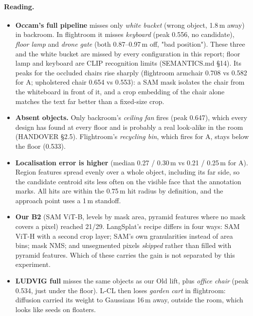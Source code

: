 \documentclass[11pt,a4paper]{article}
\begin{document}
\paragraph{Reading.}
\begin{itemize}[leftmargin=*,itemsep=2pt]
  \item \textbf{Occam's full pipeline} misses only \emph{white bucket} (wrong object, 1.8\,m away) in backroom. In
        flightroom it misses \emph{keyboard} (peak 0.556, no candidate), \emph{floor lamp} and \emph{drone gate} (both 0.87--0.97\,m off,
        "bad position"). These three and the white bucket are missed by every configuration in this report; floor lamp and keyboard are CLIP
        recognition limits (SEMANTICS.md \S14). Its peaks for the occluded chairs rise sharply (flightroom armchair 0.708
        vs 0.582 for A; upholstered chair 0.654 vs 0.553): a SAM mask isolates the chair from the whiteboard in front of
        it, and a crop embedding of the chair alone matches the text far better than a fixed-size crop.
  \item \textbf{Absent objects.} Only backroom's \emph{ceiling fan} fires (peak 0.647), which every design has found at
        every floor and is probably a real look-alike in the room (HANDOVER \S2.5). Flightroom's \emph{recycling bin},
        which fires for A, stays below the floor (0.533).
  \item \textbf{Localisation error is higher} (median 0.27 / 0.30\,m vs 0.21 / 0.25\,m for A). Region features spread
        evenly over a whole object, including its far side, so the candidate centroid sits less often on the visible face
        that the annotation marks. All hits are within the 0.75\,m hit radius by definition, and the approach point
        uses a 1\,m standoff.
  \item \textbf{Our B2} (SAM ViT-B, levels by mask area, pyramid features where no mask covers a pixel) reached 21/29.
        LangSplat's recipe differs in four ways: SAM ViT-H with a second crop layer; SAM's own granularities instead of
        area bins; mask NMS; and unsegmented pixels \emph{skipped} rather than filled with pyramid features. Which of these
        carries the gain is not separated by this experiment.
  \item \textbf{LUDVIG full} misses the same objects as our Old lift, plus \emph{office chair} (peak 0.534, just under the
        floor). L-CL then loses \emph{garden cart} in flightroom: diffusion carried its weight to Gaussians 16\,m away,
        outside the room, which looks like seeds on floaters.
\end{itemize}
\end{document}
